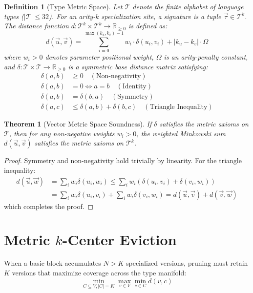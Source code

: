 \documentclass[10pt,journal,compsoc]{IEEEtran}
\newtheorem{theorem}{Theorem}
\newtheorem{definition}{Definition}
\begin{document}
\begin{definition}[Type Metric Space]
Let $\mathcal{T}$ denote the finite alphabet of language types ($|\mathcal{T}| \le 32$). For an arity-$k$ specialization site, a signature is a tuple $\vec{\tau} \in \mathcal{T}^k$. The distance function $d: \mathcal{T}^k \times \mathcal{T}^k \to \mathbb{R}_{\ge 0}$ is defined as:
\begin{equation}
d(\vec{u}, \vec{v}) = \sum_{i=0}^{\max(k_u, k_v)-1} w_i \cdot \delta(u_i, v_i) + |k_u - k_v| \cdot \Omega
\end{equation}
where $w_i > 0$ denotes parameter positional weight, $\Omega$ is an arity-penalty constant, and $\delta: \mathcal{T} \times \mathcal{T} \to \mathbb{R}_{\ge 0}$ is a symmetric base distance matrix satisfying:
\begin{align}
\delta(a, b) &\ge 0 \quad (\text{Non-negativity}) \\
\delta(a, b) &= 0 \iff a = b \quad (\text{Identity}) \\
\delta(a, b) &= \delta(b, a) \quad (\text{Symmetry}) \\
\delta(a, c) &\le \delta(a, b) + \delta(b, c) \quad (\text{Triangle Inequality})
\end{align}
\end{definition}

\begin{theorem}[Vector Metric Space Soundness]
If $\delta$ satisfies the metric axioms on $\mathcal{T}$, then for any non-negative weights $w_i > 0$, the weighted Minkowski sum $d(\vec{u}, \vec{v})$ satisfies the metric axioms on $\mathcal{T}^k$.
\end{theorem}
\begin{proof}
Symmetry and non-negativity hold trivially by linearity. For the triangle inequality:
\begin{align*}
d(\vec{u}, \vec{w}) &= \sum_i w_i \delta(u_i, w_i) \le \sum_i w_i (\delta(u_i, v_i) + \delta(v_i, w_i)) \\
&= \sum_i w_i \delta(u_i, v_i) + \sum_i w_i \delta(v_i, w_i) = d(\vec{u}, \vec{v}) + d(\vec{v}, \vec{w})
\end{align*}
which completes the proof.
\end{proof}

\section{Metric $k$-Center Eviction}

When a basic block accumulates $N > K$ specialized versions, pruning must retain $K$ versions that maximize coverage across the type manifold:
\begin{equation}
\min_{C \subseteq V, |C|=K} \max_{v \in V} \min_{c \in C} d(v, c)
\end{equation}
\end{document}
